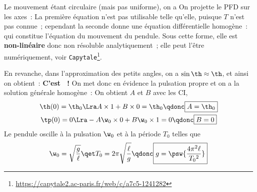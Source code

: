 \documentclass[../../main/main.tex]{subfiles}
\begin{document}
\begin{minipage}{0.25\linewidth}
\begin{center}
{		}
		\vspace{-15pt}
	\end{center}
\end{minipage}
\begin{enumerate}[label=\sqenumi, start=4]
	\psw{
		\[
			\begin{array}{ll}
				\textbf{Poids}   & \Pf = m\gf = mg(\cos\th \ur - \sin\th \ut)
				\\
				\textbf{Tension} & \Tf = -T\ur
			\end{array}
		\]
	}
	\psw{
		\[m\af = \Pf + \Tf\]
	}
	Le mouvement étant circulaire (mais pas uniforme), on a
	\psw{
		\[\af = -\ell\tp^2 \ur + \ell\tpp \ut\]
	}
	 On projette le PFD sur les axes~:
	\psw{
		\[
			\left\{
			\begin{array}{rcl}
				-m\ell\tp^2 & = & mg\cos\th - T \\
				m\ell\tpp   & = & -mg\sin\th
			\end{array}
			\right.
		\]
	}
	 La première équation n'est pas utilisable telle qu'elle,
	puisque $T$ n'est pas connue~; cependant la seconde donne une équation
	différentielle homogène~:
	\psw{
		\[\boxed{\tpp + \frac{g}{\ell}\sin\th = 0}\]
	}
	qui constitue l'équation du mouvement du pendule. Sous cette forme, elle
	est \textbf{non-linéaire} donc non résoluble analytiquement~; elle peut
	l'être numériquement, voir
	\texttt{Capytale}\footnote{\url{
			https://capytale2.ac-paris.fr/web/c/a7c5-1241282}}.
\end{enumerate}
En revanche, dans l'approximation des petits angles, on a $\sin\th\approx\th$,
et ainsi on obtient~:
\psw{
	\[\boxed{\tpp + \frac{g}{\ell}\th = 0}\]
}
\textbf{C'est ~!} On
met donc en évidence la pulsation propre
\psw{
	\[\w_0 = \sqrt{\frac{g}{\ell}}\]
}
et on a la solution générale homogène~:
\psw{
	\[\th(t) = A\cos(\w_0t) + B\sin(\w_0t)\]
}
On obtient $A$ et $B$ avec les CI,
\begin{gather*}
	\th(0) = \th_0
	\Lra A\times 1 + B\times 0 = \th_0
	\qdonc
	\boxed{A = \th_0}\\
	\tp(0) = 0
	\Lra -A\w_0\times 0 + B\w_0\times 1 = 0
	\qdonc
	\boxed{B = 0}
\end{gather*}
Le pendule oscille à la pulsation $\w_0$ et à la période $T_0$ telles que
\[
	\w_0 = \sqrt{\frac{g}{\ell}}
	\qet
	T_0 = 2\pi \sqrt{\frac{\ell}{g}}
	\qdonc
	\boxed{g = \psw{\frac{4\pi^2\ell}{T_0{}^2}}}
\]
\end{document}
